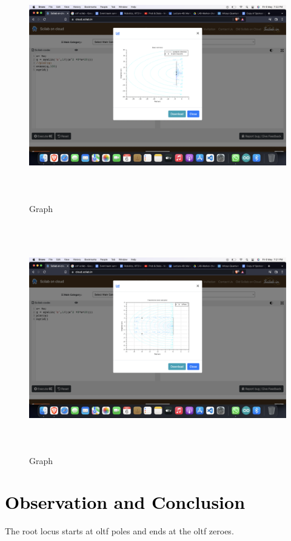 \documentclass[12pt]{article}
\begin{document}
\begin{figure}[!hth]
        \centering
        \includegraphics[width =20cm, height = 10cm]{images/exp151.png}
        \caption{Graph}
        \label{Graph}
\end{figure}
\begin{figure}[!hth]
        \centering
        \includegraphics[width =20cm, height = 10cm]{images/exp152.png}
        \caption{Graph}
        \label{Graph}
\end{figure}

\section*{\textcolor{black}{Observation and Conclusion}}
The root locus starts at oltf poles and ends at the oltf zeroes.
\pagebreak
 
\end{document}
